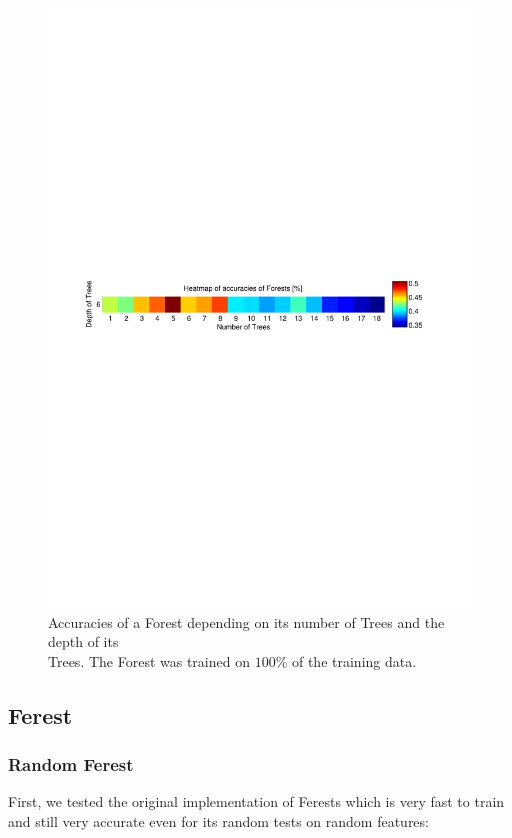 \documentclass[twocolumn]{article}
\begin{document}
\begin{figure}[t] 
\centering
\includegraphics[angle=90]{Diagrams/Heatmap}
\caption{Accuracies of a Forest depending on its number of Trees and the depth of its\\\phantom{Figure 1: }Trees. The Forest was trained on $100\%$ of the training data.}
\label{forest_heatmap_all}
\end{figure}


\subsection{Ferest}

\subsubsection{Random Ferest}

First, we tested the original implementation of Ferests which is very fast to train and still very accurate even for its random tests on random features:
\end{document}

